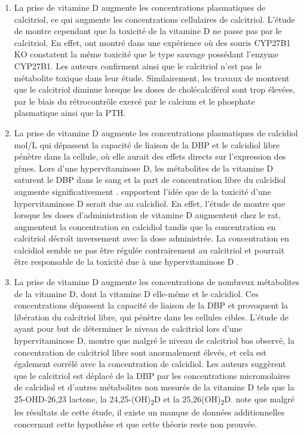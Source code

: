 \documentclass[
  a4paper,
  DIV=11,
  numbers=noendperiod,
  listof=totoc]{scrreprt}
\begin{document}
\begin{enumerate}
\def\labelenumi{\arabic{enumi}.}
\item
  La prise de vitamine D augmente les concentrations plasmatiques de
  calcitriol, ce qui augmente les concentrations cellulaires de
  calcitriol. L'étude de \textcite{DeLuca.2011} montre cependant que la
  toxicité de la vitamine D ne passe pas par le calcitriol. En effet,
  \textcite{DeLuca.2011} ont montré dans une expérience où des souris
  \ac{CYP27B1} KO constatent la même toxicité que le type sauvage
  possédant l'enzyme \ac{CYP27B1}. Les auteurs confirment ainsi que le
  calcitriol n'est pas le métabolite toxique dans leur étude.
  Similairement, les travaux de \textcite{Shepard.1980} montrent que le
  calcitriol diminue lorsque les doses de cholécalciférol sont trop
  élevées, par le biais du rétrocontrôle exercé par le calcium et le
  phosphate plasmatique ainsi que la \ac{PTH}.
\item
  La prise de vitamine D augmente les concentrations plasmatiques de
  calcidiol mol/L qui dépassent la capacité de liaison de la \ac{DBP} et
  le calcidiol libre pénètre dans la cellule, où elle aurait des effets
  directs sur l'expression des gènes. Lors d'une hypervitaminose D, les
  métabolites de la vitamine D saturent le \ac{DBP} dans le sang et la
  part de concentration libre du calcidiol augmente significativement
  \autocite{Jones.2008}. \textcite{DeLuca.2011} supportent l'idée que de
  la toxicité d'une hypervitaminose D serait due au calcidiol. En effet,
  l'étude de \textcite{Shepard.1980} montre que lorsque les doses
  d'administration de vitamine D augmentent chez le rat, augmentent la
  concentration en calcidiol tandis que la concentration en calcitriol
  décroît inversement avec la dose administrée. La concentration en
  calcidiol semble ne pas être régulée contrairement au calcitriol et
  pourrait être responsable de la toxicité due à une hypervitaminose D
  \autocite{DeLuca.2011,Shepard.1980}.
\item
  La prise de vitamine D augmente les concentrations de nombreux
  métabolites de la vitamine D, dont la vitamine D elle-même et le
  calcidiol. Ces concentrations dépassent la capacité de liaison de la
  DBP et provoquent la libération du calcitriol libre, qui pénètre dans
  les cellules cibles. L'étude de \textcite{Pettifor.1995} ayant pour
  but de déterminer le niveau de calcitriol lors d'une hypervitaminose
  D, montre que malgré le niveau de calcitriol bas observé, la
  concentration de calcitriol libre sont anormalement élevés, et cela
  est également corrélé avec la concentration de calcidiol. Les auteurs
  suggèrent que le calcitriol est déplacé de la \ac{DBP} par les
  concentrations micromolaires de calcidiol et d'autres métabolites non
  mesurés de la vitamine D tels que la 25-OHD-26,23 lactone, la
  24,25-(OH)\textsubscript{2}D et la 25,26(OH)\textsubscript{2}D.
  \textcite{Jones.2008} note que malgré les résultats de cette étude, il
  existe un manque de données additionnelles concernant cette hypothèse
  et que cette théorie reste non prouvée.
\end{enumerate}
\end{document}
